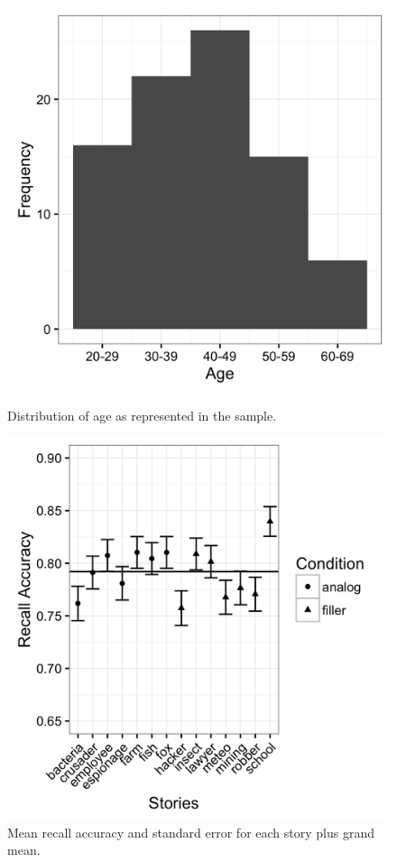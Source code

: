 \documentclass[a4paper,man,natbib,floatsintext,import]{apa6}
\begin{document}
\begin{figure}
\begin{minipage}[t]{0.5\textwidth}
  \includegraphics[width=.9\linewidth]{figures/sample_age.png}
  \caption{Distribution of age as represented in the sample.}
  \label{fig:sample_age}
\end{minipage}
\begin{minipage}[t]{0.5\textwidth}
  \includegraphics[width=.9\linewidth]{figures/material_stories.png}
  \caption{Mean recall accuracy and standard error for each story plus grand mean.}
  \label{fig:material_stories}
\end{minipage}
\end{figure}
\end{document}
